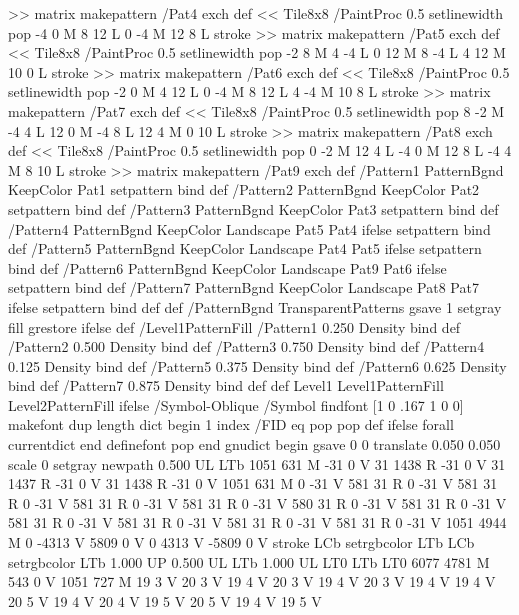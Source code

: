 {{{>> matrix makepattern
/Pat4 exch def
<< Tile8x8
 /PaintProc {0.5 setlinewidth pop -4 0 M 8 12 L
	0 -4 M 12 8 L stroke}
>> matrix makepattern
/Pat5 exch def
<< Tile8x8
 /PaintProc {0.5 setlinewidth pop -2 8 M 4 -4 L
	0 12 M 8 -4 L 4 12 M 10 0 L stroke}
>> matrix makepattern
/Pat6 exch def
<< Tile8x8
 /PaintProc {0.5 setlinewidth pop -2 0 M 4 12 L
	0 -4 M 8 12 L 4 -4 M 10 8 L stroke}
>> matrix makepattern
/Pat7 exch def
<< Tile8x8
 /PaintProc {0.5 setlinewidth pop 8 -2 M -4 4 L
	12 0 M -4 8 L 12 4 M 0 10 L stroke}
>> matrix makepattern
/Pat8 exch def
<< Tile8x8
 /PaintProc {0.5 setlinewidth pop 0 -2 M 12 4 L
	-4 0 M 12 8 L -4 4 M 8 10 L stroke}
>> matrix makepattern
/Pat9 exch def
/Pattern1 {PatternBgnd KeepColor Pat1 setpattern} bind def
/Pattern2 {PatternBgnd KeepColor Pat2 setpattern} bind def
/Pattern3 {PatternBgnd KeepColor Pat3 setpattern} bind def
/Pattern4 {PatternBgnd KeepColor Landscape {Pat5} {Pat4} ifelse setpattern} bind def
/Pattern5 {PatternBgnd KeepColor Landscape {Pat4} {Pat5} ifelse setpattern} bind def
/Pattern6 {PatternBgnd KeepColor Landscape {Pat9} {Pat6} ifelse setpattern} bind def
/Pattern7 {PatternBgnd KeepColor Landscape {Pat8} {Pat7} ifelse setpattern} bind def
} def
%
%
%
/PatternBgnd {
  TransparentPatterns {} {gsave 1 setgray fill grestore} ifelse
} def
%
%
/Level1PatternFill {
/Pattern1 {0.250 Density} bind def
/Pattern2 {0.500 Density} bind def
/Pattern3 {0.750 Density} bind def
/Pattern4 {0.125 Density} bind def
/Pattern5 {0.375 Density} bind def
/Pattern6 {0.625 Density} bind def
/Pattern7 {0.875 Density} bind def
} def
%
%
Level1 {Level1PatternFill} {Level2PatternFill} ifelse
%
/Symbol-Oblique /Symbol findfont [1 0 .167 1 0 0] makefont
dup length dict begin {1 index /FID eq {pop pop} {def} ifelse} forall
currentdict end definefont pop
end
gnudict begin
gsave
0 0 translate
0.050 0.050 scale
0 setgray
newpath
0.500 UL
LTb
1051 631 M
-31 0 V
31 1438 R
-31 0 V
31 1437 R
-31 0 V
31 1438 R
-31 0 V
1051 631 M
0 -31 V
581 31 R
0 -31 V
581 31 R
0 -31 V
581 31 R
0 -31 V
581 31 R
0 -31 V
580 31 R
0 -31 V
581 31 R
0 -31 V
581 31 R
0 -31 V
581 31 R
0 -31 V
581 31 R
0 -31 V
581 31 R
0 -31 V
1051 4944 M
0 -4313 V
5809 0 V
0 4313 V
-5809 0 V
stroke
LCb setrgbcolor
LTb
LCb setrgbcolor
LTb
1.000 UP
0.500 UL
LTb
1.000 UL
LT0
LTb
LT0
6077 4781 M
543 0 V
1051 727 M
19 3 V
20 3 V
19 4 V
20 3 V
19 4 V
20 3 V
19 4 V
19 4 V
20 5 V
19 4 V
20 4 V
19 5 V
20 5 V
19 4 V
19 5 V
}}
